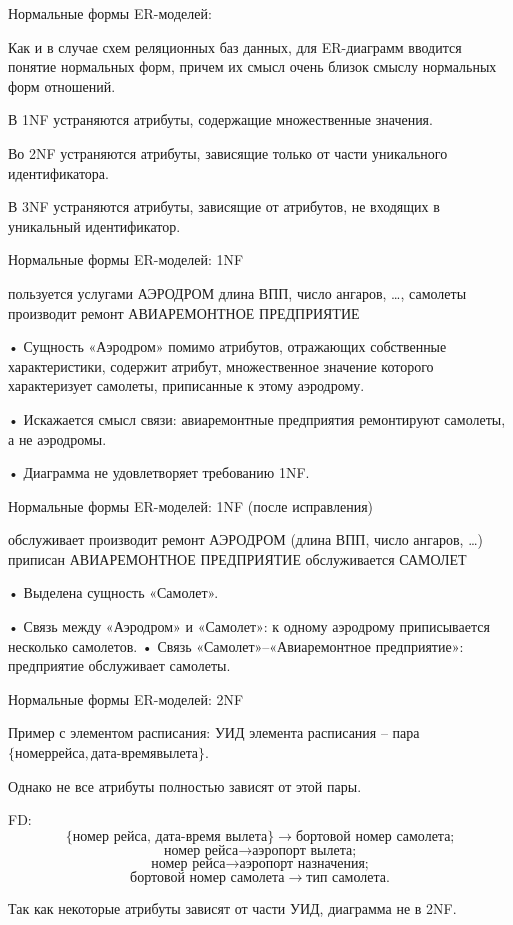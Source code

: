 \documentclass[a4paper,12pt]{article}
\begin{document}
Нормальные формы ER-моделей:

Как и в случае схем реляционных баз данных, для ER-диаграмм вводится 
понятие нормальных форм, причем их смысл очень близок 
смыслу нормальных форм отношений.

В 1NF устраняются атрибуты, содержащие 
множественные значения.

Во 2NF устраняются атрибуты, зависящие только от 
части уникального идентификатора.

В 3NF устраняются атрибуты, зависящие от 
атрибутов, не входящих в уникальный идентификатор.

Нормальные формы ER-моделей: 1NF

пользуется услугами
АЭРОДРОМ
длина ВПП, число ангаров, …, самолеты
производит ремонт
АВИАРЕМОНТНОЕ ПРЕДПРИЯТИЕ

• Сущность «Аэродром» помимо атрибутов, отражающих собственные 
характеристики, содержит атрибут, множественное значение которого 
характеризует самолеты, приписанные к этому аэродрому.

• Искажается смысл связи: авиаремонтные предприятия ремонтируют 
самолеты, а не аэродромы.

• Диаграмма не удовлетворяет требованию 1NF.

Нормальные формы ER-моделей: 1NF (после исправления)

обслуживает производит ремонт
АЭРОДРОМ (длина ВПП, число ангаров, …) приписан
АВИАРЕМОНТНОЕ ПРЕДПРИЯТИЕ обслуживается САМОЛЕТ

• Выделена сущность «Самолет».

• Связь между «Аэродром» и «Самолет»: к одному аэродрому приписывается несколько самолетов.
• Связь «Самолет»–«Авиаремонтное предприятие»: предприятие обслуживает самолеты.
  
Нормальные формы ER-моделей: 2NF

Пример с элементом расписания:
УИД элемента расписания – пара $\{номер рейса, дата\text{-}время вылета\}$.

Однако не все атрибуты полностью зависят от этой пары.

FD:
\[
\{\text{номер рейса, дата}\text{-}\text{время вылета}\} \rightarrow \text{бортовой номер самолета;}
\]
\[
\text{номер рейса} \rightarrow \text{аэропорт вылета;}
\]
\[
\text{номер рейса} \rightarrow \text{аэропорт назначения;}
\]
\[
\text{бортовой номер самолета} \rightarrow \text{тип самолета}.
\]

Так как некоторые атрибуты зависят от части УИД, диаграмма не в 2NF.
\end{document}
